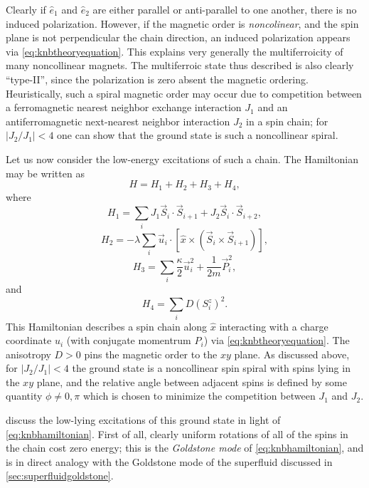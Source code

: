 Clearly if $\hat{e}_1$ and $\hat{e}_2$ are either parallel or anti-parallel to one another, there is no induced polarization.
However, if the magnetic order is \emph{noncolinear}, and the spin plane is not perpendicular the chain direction, an induced polarization appears via \cref{eq:knbtheoryequation}.
This explains very generally the multiferroicity of many noncollinear magnets.
The multiferroic state thus described is also clearly ``type-II'', since the polarization is zero absent the magnetic ordering.
Heuristically, such a spiral magnetic order may occur due to competition between a ferromagnetic nearest neighbor exchange interaction $J_1$ and an antiferromagnetic next-nearest neighbor interaction $J_2$ in a \oned spin chain; for $|J_2/J_1|<4$ one can show that the ground state is such a noncollinear spiral.

Let us now consider the low-energy excitations of such a \oned chain.
The Hamiltonian may be written as
\begin{equation}\label{eq:knbhamiltonian}
H=H_1+H_2+H_3+H_4,
\end{equation}
where
\begin{equation}
H_1 = \sum_i J_1\vec{S}_i\cdot\vec{S}_{i+1}+J_2\vec{S}_i\cdot\vec{S}_{i+2},
\end{equation}
\begin{equation}\label{eq:knbpolarizationcoupling}
H_2 = -\lambda \sum_i \vec{u}_i\cdot [\hat{x}\times (\vec{S}_i\times\vec{S}_{i+1})],
\end{equation}
\begin{equation}
H_3 = \sum_i \frac{\kappa}{2}\vec{u}_i^2+\frac{1}{2m}\vec{P}_i^2,
\end{equation}
and
\begin{equation}\label{eq:knbanisotropy}
H_4 = \sum_i D(S^z_i)^2.
\end{equation}
This Hamiltonian describes a \oned spin chain along $\hat{x}$ interacting with a charge coordinate $u_i$ (with conjugate momentrum $P_i$) via \cref{eq:knbtheoryequation}.
The anisotropy $D>0$ pins the magnetic order to the $xy$ plane.
As discussed above, for $|J_2/J_1|<4$ the ground state is a noncollinear spin spiral with spins lying in the $xy$ plane, and the relative angle between adjacent spins is defined by some quantity $\phi\neq 0,\pi$ which is chosen to minimize the competition between $J_1$ and $J_2$.

\citet{katsura_dynamical_2007} discuss the low-lying excitations of this ground state in light of \cref{eq:knbhamiltonian}.
First of all, clearly uniform rotations of all of the spins in the chain cost zero energy; this is the \emph{Goldstone mode} of \cref{eq:knbhamiltonian}, and is in direct analogy with the Goldstone mode of the superfluid discussed in \cref{sec:superfluidgoldstone}.

